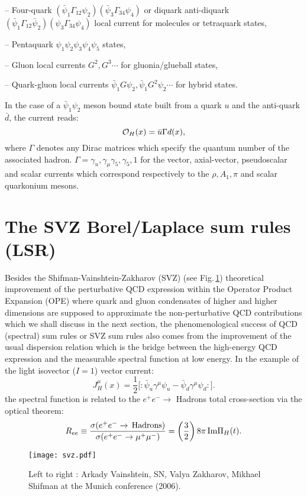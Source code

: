 \documentclass[aps,prd,groupedaddress,nofootinbib]{revtex4-1}
\def\beq{\begin{equation}}
\def\eeq{\end{equation}}
\def\ga{\left(}
\def\dr{\right)}
\begin{document}
--   Four-quark $(\bar \psi_1\Gamma_{12}\psi_2)(\bar \psi_3\Gamma_{34}\psi_4)$ or diquark anti-diquark $(\bar \psi_1\Gamma_{12}\bar\psi_2)(\psi_3\Gamma_{34}\psi_4)$ local current for molecules or tetraquark states, 

--  Pentaquark $\psi_1\psi_2\psi_3\psi_4\psi_5$ states,

-- Gluon local currents $G^2, G^3\cdots$ for gluonia/glueball states,

-- Quark-gluon local currents $\bar\psi_1G\psi_2, \bar\psi_1 G^2\psi_2\cdots $ for hybrid states.

In the case of a $\bar \psi_1\psi_2$ meson bound state built from a quark $u$ and the anti-quark $\bar d$, the current reads:
\beq
{\cal O}_H(x)=\bar u \Gamma d (x),
\eeq
where $\Gamma$ denotes any Dirac matrices which specify the quantum number of the associated hadron. $\Gamma = \gamma_u,\gamma_\mu\gamma_5,\gamma_5,1$ for the vector, axial-vector, pseudoscalar  and scalar currents which 
correspond respectively to the $\rho,A_1,\pi$ and scalar quarkonium mesons. 
\vspace*{-0.3cm}
\section{The SVZ Borel/Laplace sum rules (LSR)}
\vspace*{-0.20cm}
 Besides the Shifman-Vainshtein-Zakharov (SVZ) (see Fig.\,\ref{fig:svz}) theoretical improvement of the perturbative QCD expression within the Operator Product Expansion (OPE) where quark and gluon  condensates of higher and higher dimensions are supposed to approximate the non-perturbative QCD contributions which we shall discuss in the next section,  the phenomenological success of QCD (spectral) sum rules or SVZ sum rules  also comes from the improvement of the usual dispersion relation which is the bridge between the high-energy QCD expression and the measurable spectral function at low energy.   In the example of the light  isovector ($I=1$) vector current:
 \beq
 J^\mu_H(x)=\frac{1}{2}{[}: \bar\psi_u\gamma^\mu\psi_u-\bar\psi_d\gamma^\mu\psi_d:{]}.
 \eeq
  the spectral function is related to the $e^+e^-\to$ Hadrons total cross-section via the optical theorem:
 \beq
 R_{ee}\equiv\frac{\sigma(e^+e^-\to\,{\rm Hadrons)}}{\sigma(e^+e^-\to\mu^+\mu^-)}=\ga\frac{3}{2}\dr 8\pi\, {\rm Im} \Pi_H(t).
 \eeq%
\vspace*{-0.25cm}
\begin{figure}[hbt]
\begin{center}
\texttt{[image: svz.pdf]}
\vspace*{-0.15cm}
\caption{\footnotesize  Left to right : Arkady Vainshtein, SN, Valya Zakharov, Mikhael Shifman at the Munich conference (2006). }
\label{fig:svz}
\end{center}
\vspace*{-0.5cm}
\end{figure} 
\end{document}
